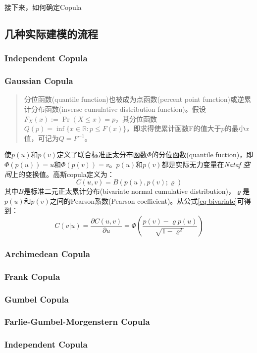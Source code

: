 接下来，如何确定Copula


\subsection{几种实际建模的流程}

\subsubsection{Independent Copula}
\subsubsection{Gaussian Copula}
\begin{quotation}
    分位函数(quantile function)也被成为点函数(percent point function)或逆累计分布函数(inverse cumulative distribution function)。假设$F_X(x) := \Pr (X \leq x) = p$，其分位函数$Q(p) = \inf\{x \in \mathbb{R} : p \leq F(x)\}$，即求得使累计函数F的值大于$p$的最小$x$值，可记为$Q = F^{-1}$。
\end{quotation}

使$p(u)$和$p(v)$定义了联合标准正太分布函数$\Phi$的\textcolor[rgb]{1,0,0}{分位函数(quantile fuction)}，即$\Phi(p(u)) = u$和$\Phi(p(v))=v$。$p(u)$和$p(v)$都是实际无力变量在\emph{Nataf 空间}上的变换值。高斯copula定义为：
\begin{equation}
    \label{eq-gaussiancopula}
    C(u,v) = B(p(u),p(v);\varrho)
\end{equation}
其中$B$是标准二元正太累计分布(bivariate normal cumulative distribution)，$\varrho$是$p(u)$和$p(v)$之间的Pearson系数(Pearson coefficient)。从公式\ref{eq-bivariate}可得到：
\begin{equation} 
    \label{eq-copula-bivariate}
    C(v|u) = \dfrac{\partial C(u,v)}{\partial u} = \Phi \left(\dfrac{p(v)-\varrho p(u)}{\sqrt{1-\varrho^{2}}}\right)
\end{equation} 

\subsubsection{Archimedean Copula}
\subsubsection{Frank Copula}
\subsubsection{Gumbel Copula}
\subsubsection{Farlie-Gumbel-Morgenstern  Copula}
\subsubsection{Independent Copula}

